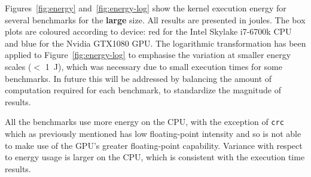 \documentclass[../document.tex]{subfiles}
\begin{document}

Figures~\ref{fig:energy} and~\ref{fig:energy-log} show the kernel execution energy for several benchmarks for the {\bf large} size.
All results are presented in joules.
The box plots are coloured according to device: red for the Intel Skylake i7-6700k CPU and blue for the Nvidia GTX1080 GPU.
The logarithmic transformation has been applied to Figure~\ref{fig:energy-log} to emphasise the variation at smaller energy scales ($<$ \SI{1}{\joule}), which was necessary due to small execution times for some benchmarks.
In future this will be addressed by balancing the amount of computation required for each benchmark, to standardize the magnitude of results.

All the benchmarks use more energy on the CPU, with the exception of {\tt crc} which as previously mentioned has low floating-point intensity and so is not able to make use of the GPU's greater floating-point capability. 
Variance with respect to energy usage is larger on the CPU, which is consistent with the execution time results.
\end{document}

